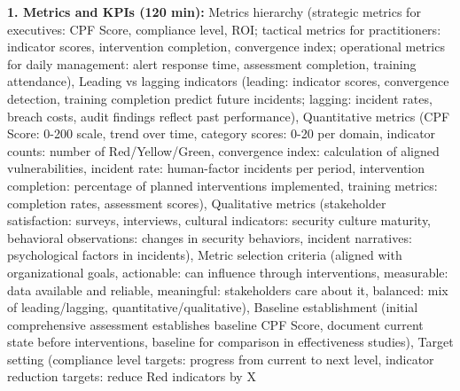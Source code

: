 \documentclass[11pt,a4paper]{article}
\begin{document}
\textbf{1. Metrics and KPIs (120 min):} Metrics hierarchy (strategic metrics for executives: CPF Score, compliance level, ROI; tactical metrics for practitioners: indicator scores, intervention completion, convergence index; operational metrics for daily management: alert response time, assessment completion, training attendance), Leading vs lagging indicators (leading: indicator scores, convergence detection, training completion predict future incidents; lagging: incident rates, breach costs, audit findings reflect past performance), Quantitative metrics (CPF Score: 0-200 scale, trend over time, category scores: 0-20 per domain, indicator counts: number of Red/Yellow/Green, convergence index: calculation of aligned vulnerabilities, incident rate: human-factor incidents per period, intervention completion: percentage of planned interventions implemented, training metrics: completion rates, assessment scores), Qualitative metrics (stakeholder satisfaction: surveys, interviews, cultural indicators: security culture maturity, behavioral observations: changes in security behaviors, incident narratives: psychological factors in incidents), Metric selection criteria (aligned with organizational goals, actionable: can influence through interventions, measurable: data available and reliable, meaningful: stakeholders care about it, balanced: mix of leading/lagging, quantitative/qualitative), Baseline establishment (initial comprehensive assessment establishes baseline CPF Score, document current state before interventions, baseline for comparison in effectiveness studies), Target setting (compliance level targets: progress from current to next level, indicator reduction targets: reduce Red indicators by X%
\end{document}
